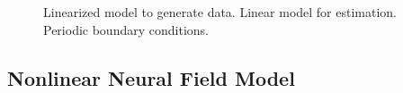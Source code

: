 \documentclass[conference]{IEEEtran}
\begin{document}
\begin{figure}[htbp]
	\centering
	\caption{Linearized model to generate data. Linear model for estimation. Periodic boundary conditions.}
	\label{fig:label}
\end{figure}

\subsection{Nonlinear Neural Field Model}
\end{document}
